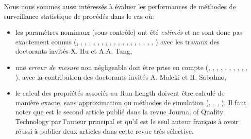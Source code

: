 Nous nous sommes aussi intéressés à évaluer les performances de
méthodes de surveillance statistique de procédés dans le cas où:
\begin{itemize}
\item les paramètres nominaux (sous-contrôle) ont été \emph{estimés}
  et ne sont donc pas exactement connus (\cite{chong:hal-01978769},
  \cite{tang:hal-02015138}, \cite{tang:hal-02145998},
  \cite{hu:hal-02155302}, \cite{hu:hal-02160997},
  \cite{castagliola:hal-02190734}, \cite{hu:hal-02318364},
  \cite{khoo:hal-02354567}, \cite{hu:hal-01835841},
  \cite{oprime:hal-01421764}, \cite{you:hal-01614074},
  \cite{teoh:hal-01583912}, \cite{hu:hal-01668745},
  \cite{wu:hal-01286478}, \cite{teoh:hal-01326056},
  \cite{castagliola:hal-01349529}, \cite{yeong:hal-01180304},
  \cite{teoh:hal-01185340}, \cite{you:hal-01216234},
  \cite{you:hal-01348052}) avec les travaux des doctorants invités
  X. Hu et A.A. Tang,
\item une \emph{erreur de mesure} non négligeable doit être prise en
  compte (\cite{sabahno:hal-01977765}, \cite{tang:hal-01978754},
  \cite{sabahno:hal-02190729}, \cite{tang:hal-01806538},
  \cite{sabahno:hal-01921390}, \cite{maleki:hal-01423386},
  \cite{tran:hal-01668732}, \cite{hu:hal-01307056},
  \cite{hu:hal-01327313}, \cite{hu:hal-01396018},
  \cite{hu:hal-01228430}), avec la contribution des doctorants invités
  A. Maleki et H. Sabahno,
\item le calcul des propriétés associés au Run Length doivent être
  calculé de manière exacte, sans approximation ou méthodes de
  simulation (\cite{castagliola:hal-02002980},
  \cite{maravelakis:hal-02022526}, \cite{tang:hal-02059892},
  \cite{khoo:hal-01354062}). Il faut noter que
  \cite{castagliola:hal-02002980} est le second article publié dans la
  revue Journal of Quality Technology par l'auteur principal et qu'il
  est le seul auteur français à avoir réussi à publier deux articles
  dans cette revue très sélective.
\end{itemize}

